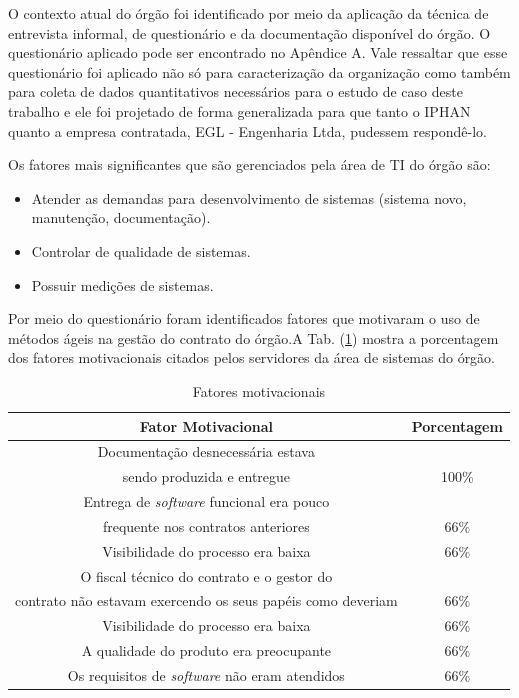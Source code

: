 O contexto atual do órgão foi identificado por meio da aplicação da técnica de entrevista informal, de questionário e da documentação disponível do órgão. O questionário aplicado pode ser encontrado no Apêndice A. Vale ressaltar que esse questionário foi aplicado não só para caracterização da organização como também para coleta de dados quantitativos necessários para o estudo de caso deste trabalho e ele foi projetado de forma generalizada para que tanto o IPHAN quanto a empresa contratada, EGL - Engenharia Ltda, pudessem respondê-lo.
 
Os fatores mais significantes que são gerenciados pela área de TI do órgão são:
\begin{itemize}
\item Atender as demandas para desenvolvimento de sistemas (sistema novo, manutenção, documentação).
\item Controlar de qualidade de sistemas.
\item Possuir medições de sistemas.
\end{itemize}

Por meio do questionário foram identificados fatores que motivaram o uso de métodos ágeis na gestão do contrato do órgão.A Tab. (\ref{fm}) mostra a porcentagem dos fatores motivacionais citados pelos servidores da área de sistemas do órgão. 

\begin{table}[H]
\center
\footnotesize
\begin{tabular}{|c|c|}
\hline
\textbf{Fator Motivacional}          & \textbf{Porcentagem}  \\ \hline
Documentação desnecessária estava \\ sendo produzida e entregue               &  100\%                 \\ \hline
Entrega de \textit{software} funcional era pouco \\ frequente nos contratos anteriores        &  66\%                  \\ \hline
Visibilidade do processo era baixa              &  66\%                \\ \hline
O fiscal técnico do contrato e o gestor do \\ contrato não estavam exercendo os seus papéis como deveriam              &  66\%                \\ \hline
Visibilidade do processo era baixa              &  66\%                \\ \hline
A qualidade do produto era preocupante   &  66\%                \\ \hline
Os requisitos de \textit{software} não eram atendidos &  66\%                \\ \hline
\end{tabular}
\caption{Fatores motivacionais}
\label{fm}
\end{table}

